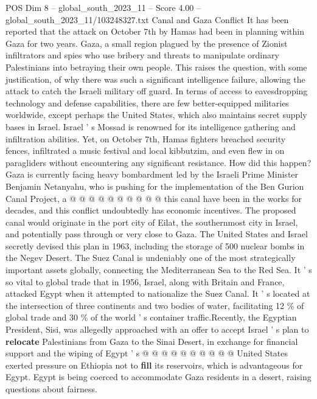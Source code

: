 \begin{textsample}{POS Dim 8 – global\_south\_2023\_11 – Score 4.00 – global\_south\_2023\_11/103248327.txt}  \label{ex:f8_pos_362}
Canal and Gaza Conflict It has been reported that the attack on October 7th by Hamas had been in planning within Gaza for two years.
Gaza, a small region plagued by the presence of Zionist infiltrators and spies who use bribery and threats to manipulate ordinary Palestinians into betraying their own people.
This raises the question, with some justification, of why there was such a significant intelligence failure, allowing the attack to catch the Israeli military off guard.
In terms of access to eavesdropping technology and defense capabilities, there are few better-equipped militaries worldwide, except perhaps the United States, which also maintains secret supply bases in Israel.
Israel ' s Mossad is renowned for its intelligence gathering and infiltration abilities.
Yet, on October 7th, Hamas fighters breached security fences, infiltrated a music festival and local kibbutzim, and even flew in on paragliders without encountering any significant resistance.
How did this happen?
Gaza is currently facing heavy bombardment led by the Israeli Prime Minister Benjamin Netanyahu, who is pushing for the implementation of the Ben Gurion Canal Project, a @ @ @ @ @ @ @ @ @ @ this canal have been in the works for decades, and this conflict undoubtedly has economic incentives.
The proposed canal would originate in the port city of Eilat, the southernmost city in Israel, and potentially pass through or very close to Gaza.
The United States and Israel secretly devised this plan in 1963, including the storage of 500 nuclear bombs in the Negev Desert.
The Suez Canal is undeniably one of the most strategically important assets globally, connecting the Mediterranean Sea to the Red Sea.
It ' s so vital to global trade that in 1956, Israel, along with Britain and France, attacked Egypt when it attempted to nationalize the Suez Canal.
It ' s located at the intersection of three continents and two bodies of water, facilitating 12 \% of global trade and 30 \% of the world ' s container traffic.Recently, the Egyptian President, Sisi, was allegedly approached with an offer to accept Israel ' s plan to \textbf{relocate} Palestinians from Gaza to the Sinai Desert, in exchange for financial support and the wiping of Egypt ' s @ @ @ @ @ @ @ @ @ @ United States exerted pressure on Ethiopia not to \textbf{fill} its reservoirs, which is advantageous for Egypt.
Egypt is being coerced to accommodate Gaza residents in a desert, raising questions about fairness.

\end{textsample}
